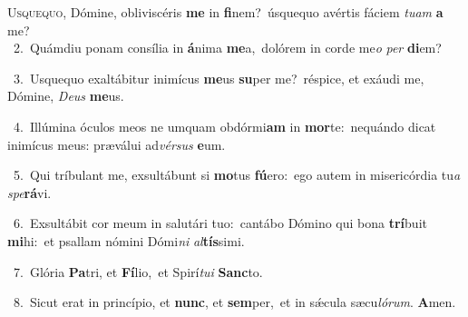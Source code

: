 \lettrine{\initial\textcolor{\initialcolor}{U}}{squequo,} Dómine, obliviscéris \textbf{me} in \textbf{fi}\-nem?~\star úsquequo avértis fáciem \textit{tu}\-\textit{am} \textbf{a} me?\\
{\numbfont\textcolor{\numbcolor}{~2.}}~Quámdiu ponam consília in \textbf{á}\-nima \textbf{me}\-a,~\star dolórem in corde me\textit{o} \textit{per} \textbf{di}\-em?\par
{\numbfont\textcolor{\numbcolor}{~3.}}~Usquequo exaltábitur inimícus \textbf{me}\-us \textbf{su}\-per me?~\star réspice, et exáudi me, Dómine, \textit{De}\-\textit{us} \textbf{me}\-us.\par
{\numbfont\textcolor{\numbcolor}{~4.}}~Illúmina óculos meos ne umquam obdórmi\textbf{am} in \textbf{mor}\-te:~\star nequándo dicat inimícus meus: præválui ad\-\textit{vér}\-\textit{sus} \textbf{e}\-um.\par
{\numbfont\textcolor{\numbcolor}{~5.}}~Qui tríbulant me, exsultábunt si \textbf{mo}\-tus \textbf{fú}\-ero:~\star ego autem in misericórdia tu\textit{a} \textit{spe}\-\textbf{rá}vi.\par
{\numbfont\textcolor{\numbcolor}{~6.}}~Exsultábit cor meum in salutári tuo:~\dagger cantábo Dómino qui bona \textbf{trí}\-buit \textbf{mi}\-hi:~\star et psallam nómini Dómi\textit{ni} \textit{al}\-\textbf{tís}simi.\par
{\numbfont\textcolor{\numbcolor}{~7.}}~Glória \textbf{Pa}\-tri, et \textbf{Fí}\-lio,~\star et Spirí\-\textit{tu}\-\textit{i} \textbf{Sanc}\-to.\par
{\numbfont\textcolor{\numbcolor}{~8.}}~Sicut erat in princípio, et \textbf{nunc}\-, et \textbf{sem}\-per,~\star et in sǽcula sæcu\-\textit{ló}\-\textit{rum}. \textbf{A}\-men.\par
